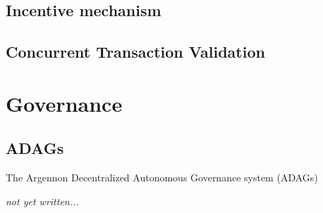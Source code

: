 \documentclass[11pt, a4paper]{report}
\newcommand{\note}[1] {
    \begin{tcolorbox}[colframe=white,colback=white]
        \emph{#1}
    \end{tcolorbox}
}
\begin{document}
    \section{Incentive mechanism}\label{sec:incentive-mechanism}
    


    \section{Concurrent Transaction Validation}\label{sec:concurrency}
    


    \chapter{Governance}\label{ch:governance}
    \section{ADAGs}\label{sec:adags}
    The Argennon Decentralized Autonomous Governance system (ADAGs)
    \note{not yet written...}
\end{document}
